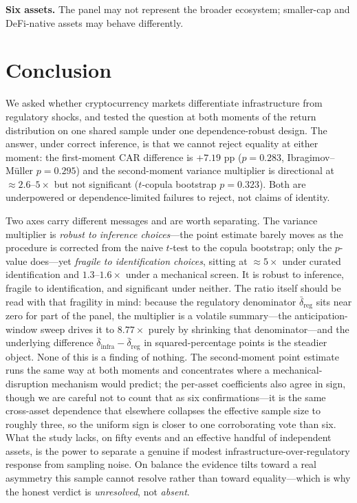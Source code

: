\documentclass[pdflatex,sn-mathphys-num]{sn-jnl}
\theoremstyle{thmstyleone}
\theoremstyle{thmstyletwo}
\theoremstyle{thmstylethree}
\begin{document}
\textbf{Six assets.} The panel may not represent the broader ecosystem; smaller-cap and DeFi-native assets may behave differently.


\section{Conclusion}\label{sec:conclusion}

We asked whether cryptocurrency markets differentiate infrastructure from regulatory shocks, and tested the question at both moments of the return distribution on one shared sample under one dependence-robust design. The answer, under correct inference, is that we cannot reject equality at either moment: the first-moment CAR difference is $+7.19$ pp ($p=0.283$, Ibragimov--M\"uller $p=0.295$) and the second-moment variance multiplier is directional at $\approx 2.6$--$5\times$ but not significant ($t$-copula bootstrap $p=0.323$). Both are underpowered or dependence-limited failures to reject, not claims of identity.

Two axes carry different messages and are worth separating. The variance multiplier is \emph{robust to inference choices}---the point estimate barely moves as the procedure is corrected from the naive $t$-test to the copula bootstrap; only the $p$-value does---yet \emph{fragile to identification choices}, sitting at $\approx 5\times$ under curated identification and $1.3$--$1.6\times$ under a mechanical screen. It is robust to inference, fragile to identification, and significant under neither. The ratio itself should be read with that fragility in mind: because the regulatory denominator $\bar\delta_{\text{reg}}$ sits near zero for part of the panel, the multiplier is a volatile summary---the anticipation-window sweep drives it to $8.77\times$ purely by shrinking that denominator---and the underlying difference $\bar\delta_{\text{infra}}-\bar\delta_{\text{reg}}$ in squared-percentage points is the steadier object. None of this is a finding of nothing. The second-moment point estimate runs the same way at both moments and concentrates where a mechanical-disruption mechanism would predict; the per-asset coefficients also agree in sign, though we are careful not to count that as six confirmations---it is the same cross-asset dependence that elsewhere collapses the effective sample size to roughly three, so the uniform sign is closer to one corroborating vote than six. What the study lacks, on fifty events and an effective handful of independent assets, is the power to separate a genuine if modest infrastructure-over-regulatory response from sampling noise. On balance the evidence tilts toward a real asymmetry this sample cannot resolve rather than toward equality---which is why the honest verdict is \emph{unresolved}, not \emph{absent}.
\end{document}
